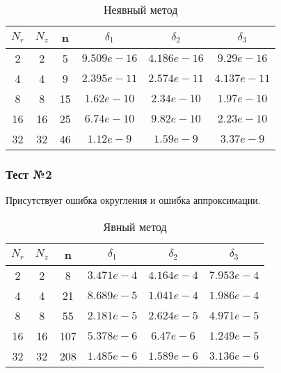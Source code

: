 \begin{table}[H]
  \begin{center}
    \begin{tabular}{*{6}c}
      \toprule
      $ N_r $ & $ N_z $ & n & $ \delta_1 $ & $ \delta_2 $ & $ \delta_3 $ \\
      \midrule
      2 & 2 & 5 & $ 9.509e-16 $ & $ 4.186e-16 $ & $ 9.29e-16 $ \\
      4 & 4 & 9 & $2.395e-11 $ & $2.574e-11 $ & $4.137e-11 $ \\
      8 & 8 & 15 & $ 1.62e-10 $ & $2.34e-10 $ & $1.97e-10 $ \\
      16 & 16 & 25 & $6.74e-10$ & $9.82e-10 $ & $2.23e-10 $ \\
      32 & 32 & 46 & $1.12e-9 $ & $1.59e-9 $ & $3.37e-9 $ \\
      \bottomrule
    \end{tabular}
    \caption{Неявный метод}
  \end{center}
\end{table}

\subsubsection*{Тест №2}

Присутствует ошибка округления и ошибка аппроксимации.

\begin{table}[H]
  \begin{center}
    \begin{tabular}{*{6}c}
      \toprule
      $ N_r $ & $ N_z $ & n & $ \delta_1 $ & $ \delta_2 $ & $ \delta_3 $ \\
      \midrule
      2 & 2 & 8 & $3.471e-4 $ & $4.164e-4 $ & $7.953e-4 $ \\
      4 & 4 & 21 & $8.689e-5 $ & $1.041e-4 $ & $1.986e-4 $ \\
      8 & 8 & 55 & $2.181e-5 $ & $2.624e-5 $ & $4.971e-5 $ \\
      16 & 16 & 107 & $5.378e-6 $ & $6.47e-6 $ & $1.249e-5 $ \\
      32 & 32 & 208 & $1.485e-6 $ & $1.589e-6 $ & $3.136e-6 $ \\
      \bottomrule
    \end{tabular}
    \caption{Явный метод}
  \end{center}
  \end{table}
  
